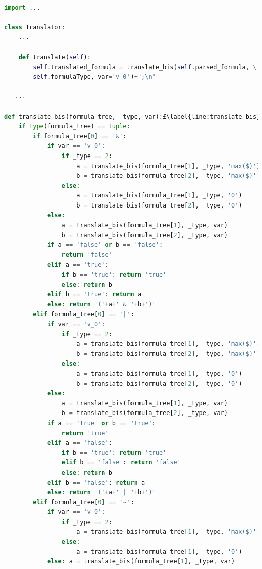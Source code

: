 \begin{lstlisting}[language=Python, style=Python, escapechar = £,  label={code:ltlf2dfa-translate-method}, caption={The \texttt{translate} method.}]
import ...

class Translator:
    ...
    
    def translate(self):
        self.translated_formula = translate_bis(self.parsed_formula, \
        self.formulaType, var='v_0')+";\n"

   ...

def translate_bis(formula_tree, _type, var):£\label{line:translate_bis}£
    if type(formula_tree) == tuple:
        if formula_tree[0] == '&':
            if var == 'v_0':
                if _type == 2:
                    a = translate_bis(formula_tree[1], _type, 'max($)')
                    b = translate_bis(formula_tree[2], _type, 'max($)')
                else:
                    a = translate_bis(formula_tree[1], _type, '0')
                    b = translate_bis(formula_tree[2], _type, '0')
            else:
                a = translate_bis(formula_tree[1], _type, var)
                b = translate_bis(formula_tree[2], _type, var)
            if a == 'false' or b == 'false':
                return 'false'
            elif a == 'true':
                if b == 'true': return 'true'
                else: return b
            elif b == 'true': return a
            else: return '('+a+' & '+b+')'
        elif formula_tree[0] == '|':
            if var == 'v_0':
                if _type == 2:
                    a = translate_bis(formula_tree[1], _type, 'max($)')
                    b = translate_bis(formula_tree[2], _type, 'max($)')
                else:
                    a = translate_bis(formula_tree[1], _type, '0')
                    b = translate_bis(formula_tree[2], _type, '0')
            else:
                a = translate_bis(formula_tree[1], _type, var)
                b = translate_bis(formula_tree[2], _type, var)
            if a == 'true' or b == 'true':
                return 'true'
            elif a == 'false':
                if b == 'true': return 'true'
                elif b == 'false': return 'false'
                else: return b
            elif b == 'false': return a
            else: return '('+a+' | '+b+')'
        elif formula_tree[0] == '~':
            if var == 'v_0':
                if _type == 2:
                    a = translate_bis(formula_tree[1], _type, 'max($)')
                else:
                    a = translate_bis(formula_tree[1], _type, '0')
            else: a = translate_bis(formula_tree[1], _type, var)

\end{lstlisting}

